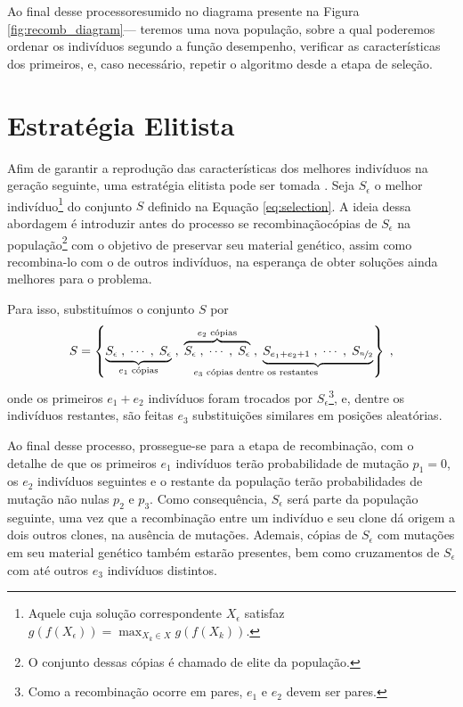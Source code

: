 Ao final desse processo\trav resumido no diagrama presente na Figura \ref{fig:recomb_diagram}\;---
teremos uma nova população, sobre a qual poderemos ordenar os indivíduos segundo a função desempenho, verificar
as características dos primeiros, e, caso necessário, repetir o algoritmo desde a etapa de seleção.

\section{Estratégia Elitista}

Afim de garantir a reprodução das características dos melhores indivíduos na geração seguinte, uma
estratégia elitista pode ser tomada \cite{goldberg1989ga} \cite{roncaratti2006ga}.
Seja $S_{\epsilon}$ o melhor indivíduo\footnote{
  Aquele cuja solução correspondente $X_{\epsilon}$ satisfaz $ g(f(X_{\epsilon})) = \max_{X_k \in X} g(f(X_k)) $.
}
do conjunto $S$ definido na Equação \ref{eq:selection}. A ideia dessa abordagem é introduzir\trav
antes do processo se recombinação\trav cópias de $S_{\epsilon}$ na população\footnote{
  O conjunto dessas cópias é chamado de elite da população.
}
com o objetivo de preservar seu material genético, assim como recombina-lo com o de outros indivíduos, na esperança
de obter soluções ainda melhores para o problema.

Para isso, substituímos o conjunto $S$ por
\begin{equation}
  S =
  \left\{
  \underbrace{S_{\epsilon}\;, \mathdots,  \;S_{\epsilon}}_{e_1 \text{ cópias}}\;,\;
  \overbrace{S_{\epsilon}\;, \mathdots,  \;S_{\epsilon}}^{e_2 \text{ cópias}}\;,\;
  \underbrace{S_{e_1 + e_2 + 1}\;, \mathdots,  \;S_{\nicefrac{n}{2}}}_{\mathllap{e_3 \text{ cópias dentre os restantes}}}
  \right\}
  \mathcomma
\end{equation}
onde os primeiros $e_1 + e_2$ indivíduos foram trocados por $S_{\epsilon}$\footnote{
  Como a recombinação ocorre em pares, $e_1$ e $e_2$ devem ser pares.
}, e, dentre os indivíduos restantes,
são feitas $e_3$ substituições similares em posições aleatórias.

Ao final desse processo, prossegue-se para a etapa de recombinação, com o detalhe de que os primeiros $e_1$
indivíduos terão probabilidade de mutação $p_1 = 0$, os $e_2$ indivíduos seguintes e o restante da população
terão probabilidades de mutação não nulas $p_2$ e $p_3$.
Como consequência, $S_{\epsilon}$ será parte da população seguinte, uma vez que a recombinação entre um
indivíduo e seu clone dá origem a dois outros clones, na ausência de mutações.
Ademais, cópias de $S_{\epsilon}$ com mutações em seu material genético também
estarão presentes, bem como cruzamentos de $S_{\epsilon}$ com até outros $e_3$
indivíduos distintos.